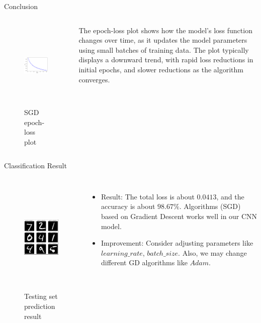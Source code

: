 \documentclass{beamer}
\begin{document}
\begin{frame}{Conclusion}
	\begin{columns}[T,onlytextwidth]
		\begin{figure}
			\centering 
			\includegraphics[width=1\columnwidth,height=4.2cm]{img/loss.png}
			\caption{SGD epoch-loss plot}
		\end{figure}

	
		  \quad The epoch-loss plot  shows how the model's 
		  loss function changes over time, as it updates the model 
		  parameters using small batches of training data. The plot 
		  typically displays a downward trend, with rapid 
		  loss reductions in initial epochs, and slower reductions 
		  as the algorithm converges. 
	\end{columns}
\end{frame}

\begin{frame}{Classification Result}
	\begin{columns}[T,onlytextwidth]
		\begin{figure}
			\centering 
			\includegraphics[width=1\columnwidth,height=5.5cm]{img/result.png}
			\caption{Testing set prediction result}
		\end{figure}

	
		\begin{itemize}
			\item Result: The total loss is about $0.0413$, 
			and the accuracy is about $98.67\%$. Algorithms (SGD) 
			based on Gradient Descent works well in our CNN model.
			\item Improvement: Consider adjusting
			parameters like $learning\_rate$, $batch\_size$. Also, we may 
			change different GD algorithms like $Adam$.
		\end{itemize} 
	\end{columns}
\end{frame}
\end{document}
